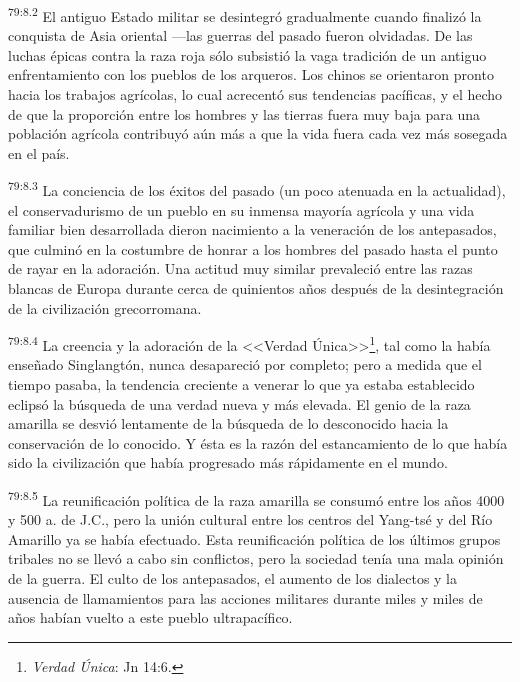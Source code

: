 \par
\textsuperscript{79:8.2} El antiguo Estado militar se desintegró gradualmente cuando finalizó la conquista de Asia oriental ---las guerras del pasado fueron olvidadas. De las luchas épicas contra la raza roja sólo subsistió la vaga tradición de un antiguo enfrentamiento con los pueblos de los arqueros. Los chinos se orientaron pronto hacia los trabajos agrícolas, lo cual acrecentó sus tendencias pacíficas, y el hecho de que la proporción entre los hombres y las tierras fuera muy baja para una población agrícola contribuyó aún más a que la vida fuera cada vez más sosegada en el país.

\par
\textsuperscript{79:8.3} La conciencia de los éxitos del pasado (un poco atenuada en la actualidad), el conservadurismo de un pueblo en su inmensa mayoría agrícola y una vida familiar bien desarrollada dieron nacimiento a la veneración de los antepasados, que culminó en la costumbre de honrar a los hombres del pasado hasta el punto de rayar en la adoración. Una actitud muy similar prevaleció entre las razas blancas de Europa durante cerca de quinientos años después de la desintegración de la civilización grecorromana.

\par
\textsuperscript{79:8.4} La creencia y la adoración de la <<Verdad
Única>>\footnote{\textit{Verdad
Única}: Jn 14:6.}, tal como la había enseñado Singlangtón, nunca desapareció por completo; pero a medida que el tiempo pasaba, la tendencia creciente a venerar lo que ya estaba establecido eclipsó la búsqueda de una verdad nueva y más elevada. El genio de la raza amarilla se desvió lentamente de la búsqueda de lo desconocido hacia la conservación de lo conocido. Y ésta es la razón del estancamiento de lo que había sido la civilización que había progresado más rápidamente en el mundo.

\par
\textsuperscript{79:8.5} La reunificación política de la raza amarilla se consumó entre los años 4000 y 500 a. de J.C., pero la unión cultural entre los centros del Yang-tsé y del Río Amarillo ya se había efectuado. Esta reunificación política de los últimos grupos tribales no se llevó a cabo sin conflictos, pero la sociedad tenía una mala opinión de la guerra. El culto de los antepasados, el aumento de los dialectos y la ausencia de llamamientos para las acciones militares durante miles y miles de años habían vuelto a este pueblo ultrapacífico.

